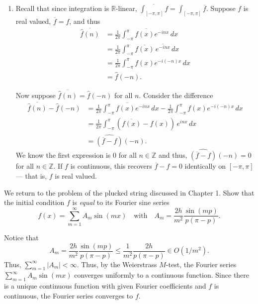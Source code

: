 \documentclass[12 pt, letterpaper]{hmcpset}
\begin{document}
\begin{solution}
\begin{enumerate}
			If $n$ is odd, $(e^{i \pi})^{n}$ is negative, and thus, the terms cancel giving $\hat{f}(n) = 0$ for odd $n$.

		\item Recall that since integration is $\mathbb{R}$-linear, $\overline{\int_{[-\pi, \pi]} f} = \int_{[-\pi, \pi]} \overline{f}$. Suppose $f$ is real valued, $\overline{f} = f$, and thus
			\begin{align*}
				\overline{\hat{f}(n)} & = \overline{\frac{1}{2 \pi} \int_{-\pi}^{\pi} f(x) e^{-i n x} \, dx} \\
						      & = \frac{1}{2 \pi} \int_{-\pi}^{\pi} \overline{f(x)} \, \overline{e^{-i n x}} \, dx \\
						      & = \frac{1}{2 \pi} \int_{-\pi}^{\pi} f(x) e^{-i (-n) x} \, dx \\
						      & = \hat{f}(-n).
			\end{align*}

			Now suppose $\overline{\hat{f}(n)} = \hat{f}(-n)$ for all $n$. Consider the difference
			\begin{align*}
				\overline{\hat{f}(n)} - \hat{f}(-n) & = \overline{\frac{1}{2 \pi} \int_{-\pi}^{\pi} f(x) e^{-i n x} \, dx} - \frac{1}{2 \pi} \int_{-\pi}^{\pi} f(x) e^{-i (-n) x} \, dx \\
								    & = \frac{1}{2 \pi} \int_{-\pi}^{\pi} (\overline{f(x)} - f(x) ) \, e^{i n x} \, dx \\
								    & = \widehat{(\overline{f} - f)}(-n).
			\end{align*}
			We know the first expression is $0$ for all $n \in \mathbb{Z}$ and thus, $\widehat{(\overline{f} - f)}(-n) = 0$ for all $n \in \mathbb{Z}$. If $f$ is continuous, this recovers $\overline{f} - f = 0$ identically on $[-\pi, \pi]$ --- that is, $f$ is real valued.
	\end{enumerate}
\end{solution}

\pagebreak

\begin{problem}[S \& S \S 2.6 \#3.]
	We return to the problem of the plucked string discussed in Chapter 1. Show that the initial condition $f$ is \emph{equal} to its Fourier sine series
	\[
		f(x) = \sum_{m = 1}^{\infty} A_{m} \sin{(m x)} \quad \text{with} \quad A_{m} = \frac{2h}{m^{2}} \frac{\sin{(m p)}}{p(\pi - p)}.
	\]
\end{problem}

\begin{solution}
	Notice that
	\[
		A_{m} = \frac{2h}{m^{2}} \frac{\sin{(mp)}}{p (\pi - p)} \le \frac{1}{m^{2}} \frac{2h}{p(\pi - p)} \in O(1 / m^{2}).
	\]
	Thus, $\sum_{m = 1}^{\infty} \lvert A_{m} \rvert < \infty$. Thus, by the Weierstrass $M$-test, the Fourier series $\sum_{m = 1}^{\infty} A_{m} \sin{(m x)}$ converges uniformly to a continuous function. Since there is a unique continuous function with given Fourier coefficients and $f$ is continuous, the Fourier series converges to $f$.
\end{solution}
\end{document}
